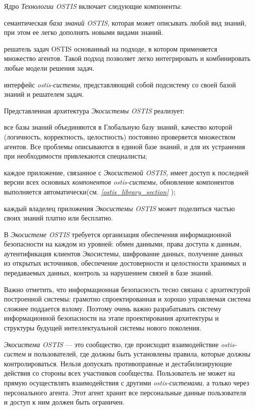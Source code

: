 Ядро \textit{Технологии OSTIS} включает следующие компоненты:
\begin{textitemize}
	\item семантическая \textit{база знаний OSTIS}, которая может описывать любой вид знаний, при этом ее легко дополнять новыми видами знаний.
	\item решатель задач OSTIS основанный на подходе, в котором применяется множество агентов. Такой подход позволяет легко интегрировать и комбинировать любые модели решения задач.
	\item интерфейс \textit{ostis-системы}, представляющий собой подсистему со своей базой знаний и решателем задач.
\end{textitemize}

Представленная архитектура \textit{Экосистемы OSTIS} реализует:
\begin{textitemize}
	\item все базы знаний объединяются в Глобальную базу знаний, качество которой (логичность, корректность, целостность) постоянно проверяется множеством агентов. Все проблемы описываются в единой базе знаний, и для их устранения при необходимости привлекаются специалисты;
	\item каждое приложение, связанное с \textit{Экосистемой OSTIS}, имеет доступ к последней версии всех основных \textit{компонентов ostis-системы}, обновление компонентов выполняется автоматически(см. \textit{\ref{ostis_library_section} });
	\item каждый владелец приложения \textit{Экосистемы OSTIS} может поделиться частью своих знаний платно или бесплатно.
\end{textitemize}

В \textit{Экосистеме OSTIS} требуется организация обеспечения информационной безопасности на каждом из уровней: обмен данными, права доступа к данным, аутентификация клиентов Экосистемы, шифрование данных, получение данных из открытых источников, обеспечение достоверности и целостности хранимых и передаваемых данных, контроль за нарушением связей в базе знаний.

Важно отметить, что информационная безопасность тесно связана с архитектурой построенной системы: грамотно спроектированная и хорошо управляемая система сложнее поддается взлому. Поэтому очень важно разрабатывать систему информационной безопасности на этапе проектирования архитектуры и структуры будущей интеллектуальной системы нового поколения.

\textit{Экосистема OSTIS} --- это сообщество, где происходит взаимодействие \textit{ostis-систем} и пользователей, где должны быть установлены правила, которые должны контролироваться. Нельзя допускать противоправные и дестабилизирующие действия со стороны всех участников сообщества. Пользователь не может на прямую осуществлять взаимодействия с другими \textit{ostis-системами}, а только через персонального агента. Этот агент хранит все персональные данные пользователя и доступ к ним должен быть ограничен.

